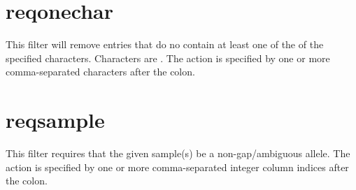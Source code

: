 \documentclass[letterpaper,11pt,english]{sphinxmanual}
\begin{document}
%
\begin{sphinxVerbatim}[commandchars=\\\{\}]
  
 
 
 
\end{sphinxVerbatim}


\section{reqonechar}
\label{\detokenize{mvf_filter_modules:reqonechar}}
This filter will remove entries that do no contain at least
one of the of the specified  characters. Characters are
. The action is specified by one or more
comma-separated characters after the colon.

%
\begin{sphinxVerbatim}[commandchars=\\\{\}]
  
 
 
 
\end{sphinxVerbatim}


\section{reqsample}
\label{\detokenize{mvf_filter_modules:reqsample}}
This filter requires that the given sample(s) be a non-gap/ambiguous
allele. The action is specified by one or more
comma-separated integer column indices after the colon.

%
\begin{sphinxVerbatim}[commandchars=\\\{\}]
  
 
 
 
\end{sphinxVerbatim}
\end{document}
